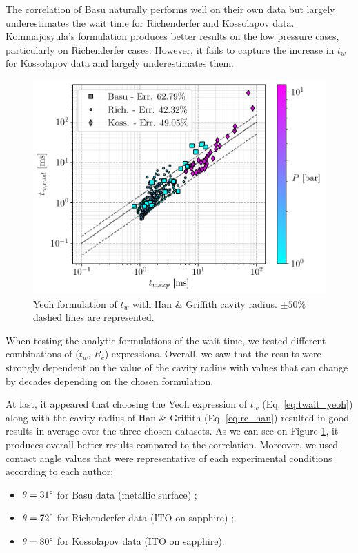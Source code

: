 \npar
The correlation of Basu \etal naturally performs well on their own data but largely underestimates the wait time for Richenderfer and Kossolapov data. Kommajosyula's formulation produces better results on the low pressure cases, particularly on Richenderfer cases. However, it fails to capture the increase in $t_{w}$ for Kossolapov data and largely underestimates them.


\begin{figure}[!h]
\centering
\includegraphics[width=0.5\linewidth]{img/tw/twYeoh_RcHan.pdf}
\caption{Yeoh \etal formulation of $t_{w}$ with Han \& Griffith cavity radius. $\pm 50\%$ dashed lines are represented.}
\label{fig:tw_pred_anal}
\end{figure}

\npar
When testing the analytic formulations of the wait time, we tested different combinations of ($t_{w}$, $R_{c}$) expressions. Overall, we saw that the results were strongly dependent on the value of the cavity radius with values that can change by decades depending on the chosen formulation.

\npar
At last, it appeared that choosing the Yeoh \etal expression of $t_{w}$ (Eq. \ref{eq:twait_yeoh}) along with the cavity radius of Han \& Griffith (Eq. \ref{eq:rc_han}) resulted in good results in average over the three chosen datasets. As we can see on Figure \ref{fig:tw_pred_anal}, it produces overall better results compared to the correlation. Moreover, we used contact angle values that were representative of each experimental conditions according to each author:

\begin{itemize}
\item $\theta = 31 \degree$ for Basu \etal data \cite{basu_wall_2005-1} (metallic surface) ;
\item $\theta = 72 \degree$ for Richenderfer data \cite{richenderfer_experimental_2018} (ITO on sapphire) ;
\item $\theta = 80 \degree$ for Kossolapov data \cite{kossolapov_experimental_2021} (ITO on sapphire).
\end{itemize} 

